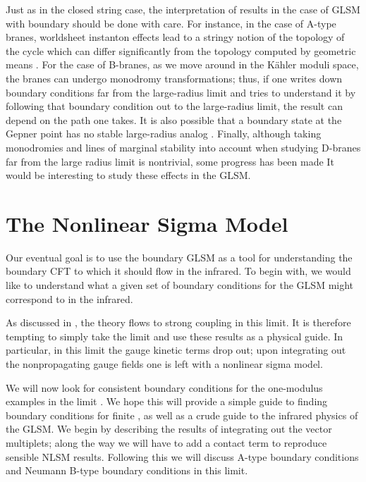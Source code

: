 \documentclass[a4paper,12pt]{article}
\begin{document}
Just as in the closed string case, the interpretation of results
in the case of GLSM with boundary should be done with care.
For instance, in the case of A-type branes,
worldsheet instanton effects lead to a stringy
notion of the topology of the cycle
which can differ significantly from the
topology computed by geometric means \cite{kklm2}.
For the case of B-branes, as we move around
in the K\"ahler moduli space, the branes
can undergo monodromy transformations; thus,
if one writes down boundary conditions far from
the large-radius limit and tries to understand
it by following that boundary condition out
to the large-radius limit, the result can depend
on the path one takes. It is also possible that
a boundary state at the Gepner point has no stable large-radius analog
\cite{doug1,dfr}.
Finally, although taking monodromies and
lines of marginal stability into account when studying D-branes far
from the large radius limit is nontrivial, some progress has been made 
\cite{quintic,doug1,dfr} It would be interesting to study
these effects in the GLSM.


\section{The Nonlinear Sigma Model}

Our eventual goal is to use the boundary GLSM as a tool
for understanding the boundary CFT to which it should flow in the infrared.
To begin with, we would like to understand
what a given set of boundary conditions for the GLSM
might correspond to in the infrared.

As discussed in \cite{wittenphases}, the theory
flows to strong coupling in this limit.  It is therefore
tempting to simply take the limit \coordHE{}
and use these results as a physical guide.  In particular,
in this limit the gauge kinetic terms drop out; upon
integrating out the nonpropagating gauge fields one
is left with a nonlinear sigma model.

We will now look for consistent
boundary conditions for the one-modulus examples
in the limit \coordHE{}.  We hope this will provide 
a simple guide to
finding boundary conditions for finite \coordHE{},
as well as a crude guide to the infrared physics of the GLSM.
We begin by describing the results of integrating
out the vector multiplets; along the way we will
have to add a contact term to reproduce sensible
\coordHE{} NLSM results.  Following this we will discuss
A-type boundary conditions and Neumann B-type
boundary conditions in this limit.
\end{document}
